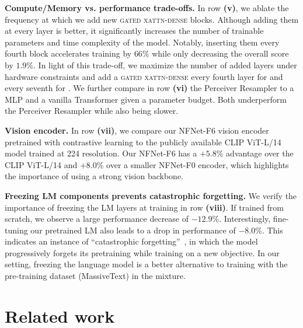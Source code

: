 \noindent
\textbf{Compute/Memory vs. performance trade-offs.}
In row \textbf{(v)}, we ablate the frequency at which we add new \textsc{gated xattn-dense} blocks.
Although adding them at every layer is better, it significantly increases the number of trainable parameters and time complexity of the model.
Notably, inserting them every fourth block accelerates training by $66\%$ while only decreasing the overall score by $1.9\%$.
In light of this trade-off, we maximize the number of added layers under hardware constraints and add a \textsc{gated xattn-dense} every fourth layer for \medium{} and every seventh for \largemfull{}.
We further compare in row \textbf{(vi)} the Perceiver Resampler to a MLP and a vanilla Transformer given a parameter budget.
Both underperform the Perceiver Resampler while also being slower.


\noindent
\textbf{Vision encoder.}
In row \textbf{(vii)}, we compare our NFNet-F6 vision encoder pretrained with contrastive learning  to the publicly available CLIP ViT-L/14~\citep{clip} model trained at 224 resolution.
Our NFNet-F6 has a $+5.8\%$ advantage over the CLIP ViT-L/14 and $+8.0\%$ over a smaller NFNet-F0 encoder, which highlights the importance of using a strong vision backbone.

\noindent
\textbf{Freezing LM components prevents catastrophic forgetting.} %
We verify the importance of freezing the LM layers at training in row \textbf{(viii)}.
If trained from scratch, we observe a large performance decrease of $-12.9\%$.
Interestingly, fine-tuning our pretrained LM also leads to a drop in performance of $-8.0\%$.
This indicates an instance of ``catastrophic forgetting''~\citep{mccloskey1989catastrophic}, in which the model progressively forgets its pretraining while training on a new objective. In our setting, freezing the language model is a better alternative to training with the pre-training dataset (MassiveText) in the mixture.


\section{Related work}

